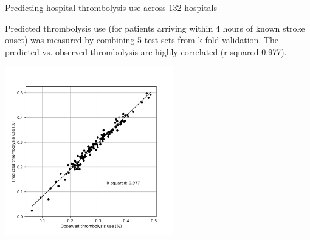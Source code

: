 \begin{frame}{Predicting hospital thrombolysis use across 132 hospitals}

\small
Predicted thrombolysis use (for patients arriving within 4 hours of known stroke onset) was measured by combining 5 test sets from k-fold validation. The predicted vs. observed thrombolysis are highly correlated (r-squared 0.977). 

\begin{center}
\includegraphics[width=0.55\textwidth]{./images/02_xgb_10_features_observed_predicted_rates.jpg}
\end{center}



\end{frame}